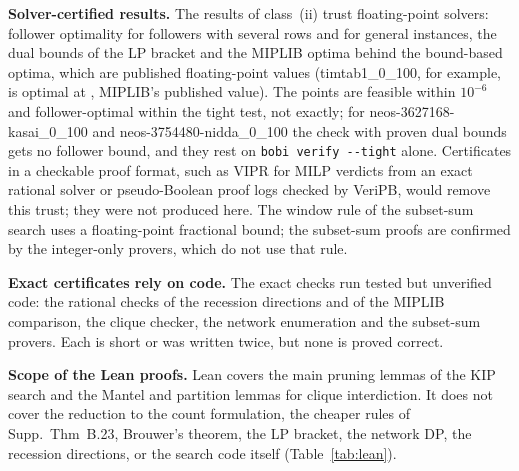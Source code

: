 \documentclass[]{spie}  %
\theoremstyle{plain}
\newcommand{\code}[1]{\texttt{#1}}
\newcommand{\inst}[1]{\mbox{#1}}             %
\newcommand{\cls}[1]{class~(#1)}             %
\begin{document}
\textbf{Solver-certified results.} The results of \cls{ii} trust floating-point solvers: follower
optimality for followers with several rows and for general instances, the dual bounds of the LP
bracket and the MIPLIB optima behind the \NumHprOptimal{} bound-based optima, which are published
floating-point values (\inst{timtab1\_0\_100}, for example, is optimal at \TimtabOptimum{}, MIPLIB's
published value). The points are feasible within $10^{-6}$ and follower-optimal within the tight
test, not exactly; for \inst{neos-3627168-kasai\_0\_100} and \inst{neos-3754480-nidda\_0\_100} the
check with proven dual bounds gets no follower bound, and they rest on \code{bobi verify -{}-tight}
alone. Certificates in a checkable proof format,
such as VIPR for MILP verdicts\cite{cheung2017verifying} from an exact rational
solver\cite{eifler2023computational} or pseudo-Boolean proof logs checked by
VeriPB,\cite{bogaerts2023certified} would remove this trust; they were not produced here. The
window rule of the subset-sum search uses a floating-point fractional bound; the \NumNewKip{}
subset-sum proofs are confirmed by the integer-only provers, which do not use that rule.

\textbf{Exact certificates rely on code.} The exact checks run tested but unverified code: the
rational checks of the recession directions and of the MIPLIB comparison, the clique checker, the
network enumeration and the subset-sum provers. Each is short or was written twice, but none is
proved correct.

\textbf{Scope of the Lean proofs.} Lean covers the main pruning lemmas of the KIP search and the
Mantel and partition lemmas for clique interdiction. It does not cover the reduction to the count
formulation, the cheaper rules of Supp.\ Thm~B.23, Brouwer's theorem, the LP bracket, the network
DP, the recession directions, or the search code itself (Table~\ref{tab:lean}).
\end{document}
